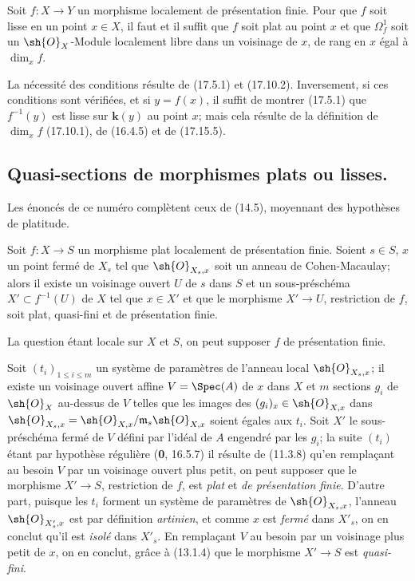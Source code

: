 \begin{proposition}[17.15.15]
\label{IV.17.15.15}
Soit $f:X\to Y$ un morphisme localement de présentation finie. Pour que $f$ soit lisse en un point $x\in X$, il faut et il suffit que $f$ soit plat au point $x$ et que $\varOmega^1_f$ soit un $\sh{O}_X$-Module localement libre dans un voisinage de $x$, de rang en $x$ égal à $\dim_x f$.
\end{proposition}

La nécessité des conditions résulte de (17.5.1) et (17.10.2). Inversement, si ces conditions sont vérifiées, et si $y=f(x)$, il suffit de montrer (17.5.1) que $f^{-1}(y)$ est lisse sur $\boldsymbol{k}(y)$ au point $x$; mais cela résulte de la définition de $\dim_x f$ (17.10.1), de (16.4.5) et de (17.15.5).

\subsection{Quasi-sections de morphismes plats ou lisses.}

Les énoncés de ce numéro complètent ceux de (14.5), moyennant des hypothèses de platitude.

\begin{proposition}[17.16.1]
\label{IV.17.16.1}
Soit $f:X\to S$ un morphisme plat localement de présentation finie. Soient $s\in S$, $x$ un point fermé de $X_s$ tel que $\sh{O}_{X_s,x}$ soit un anneau de Cohen-Macaulay; alors il existe un voisinage ouvert $U$ de $s$ dans $S$ et un sous-préschéma $X'\subset f^{-1}(U)$ de $X$ tel que $x\in X'$ et que le morphisme $X'\to U$, restriction de $f$, soit plat, quasi-fini et de présentation finie.
\end{proposition}

La question étant locale sur $X$ et $S$, on peut supposer $f$ de présentation finie.

Soit $(t_i)_{1\leq i\leq m}$ un système de paramètres de l'anneau local $\sh{O}_{X_s,x}$; il existe un voisinage ouvert affine $V=\Spec(A)$ de $x$ dans $X$ et $m$ sections $g_i$ de $\sh{O}_X$ au-dessus de $V$ telles que
les images des $(g_i)_x\in\sh{O}_{X,x}$ dans $\sh{O}_{X_s,x}=\sh{O}_{X,x}/\mathfrak m_s\sh{O}_{X,x}$ soient égales aux $t_i$. Soit $X'$ le sous-préschéma fermé de $V$ défini par l'idéal de $A$ engendré par les $g_i$; la suite $(t_i)$ étant par hypothèse régulière (\textbf{0}, 16.5.7) il résulte de (11.3.8) qu'en remplaçant au besoin $V$ par un voisinage ouvert plus petit, on peut supposer que le morphisme $X'\to S$, restriction de $f$, est \emph{plat} et \emph{de présentation finie}. D'autre part, puisque les $t_i$ forment un système de paramètres de $\sh{O}_{X_s,x}$, l'anneau $\sh{O}_{X'_s,x}$ est par définition \emph{artinien}, et comme $x$ est \emph{fermé} dans $X'_s$, on en conclut qu'il est \emph{isolé} dans $X'_s$. En remplaçant $V$ au besoin par un voisinage plus petit de $x$, on en conclut, grâce à (13.1.4) que le morphisme $X'\to S$ est \emph{quasi-fini}.

